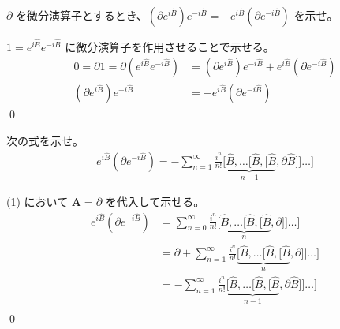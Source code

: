 \documentclass[uplatex,dvipdfmx,a4paper,11pt]{jlreq}
\makeatletter
\newcommand{\BB}{\bm{B}}
\renewcommand{\AA}{\hat{A}}
\renewcommand{\BB}{\hat{B}}
\renewcommand{\AA}{\bm{A}}
\numberwithin{equation}{section}
\theoremstyle{definition}
\renewenvironment{proof}[1][\proofname]{\par
  \normalfont
  \topsep6\p@\@plus6\p@ \trivlist
  \item[\hskip\labelsep{\bfseries #1}\@addpunct{\bfseries}]\ignorespaces\quad\par
}{%
  \qed\endtrivlist\@endpefalse
}
\renewcommand\proofname{証明}
\makeatother
\begin{document}
\begin{problem}
$\partial$ を微分演算子とするとき、$(\partial e^{i\BB})e^{-i\BB} = -e^{i\BB}(\partial e^{-i\BB})$ を示せ。
\end{problem}
\begin{proof}
  $1 = e^{i\BB}e^{-i\BB}$ に微分演算子を作用させることで示せる。
  \begin{align}
    0 = \partial 1 = \partial(e^{i\BB}e^{-i\BB}) & = (\partial e^{i\BB})e^{-i\BB} + e^{i\BB}(\partial e^{-i\BB}) \\
    (\partial e^{i\BB})e^{-i\BB}                 & = -e^{i\BB}(\partial e^{-i\BB})
  \end{align}
\end{proof}

\begin{problem}
次の式を示せ。
\begin{align}
  e^{i\BB}(\partial e^{-i\BB}) = -\sum_{n=1}^{\infty}\frac{i^n}{n!}\underbrace{[\BB, \ldots [\BB, [\BB}_{n-1}, \partial\BB]] \ldots]
\end{align}
\end{problem}
\begin{proof}
  (1) において $\AA = \partial$ を代入して示せる。
  \begin{align}
    e^{i\BB}(\partial e^{-i\BB}) & = \sum_{n=0}^{\infty}\frac{i^n}{n!}\underbrace{[\BB, \ldots [\BB, [\BB}_{n}, \partial]] \ldots]            \\
                                 & = \partial + \sum_{n=1}^{\infty}\frac{i^n}{n!}\underbrace{[\BB, \ldots [\BB, [\BB}_{n}, \partial]] \ldots] \\
                                 & = -\sum_{n=1}^{\infty}\frac{i^n}{n!}\underbrace{[\BB, \ldots [\BB, [\BB}_{n-1}, \partial\BB]] \ldots]      \\
  \end{align}
\end{proof}
\end{document}
